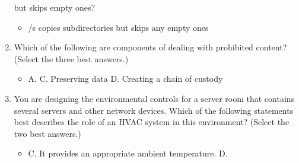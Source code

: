 \documentclass{article}
\begin{document}
\begin{enumerate}
but skips empty ones?
    \begin{itemize}
        \item /s copies subdirectories but skips any empty ones
    \end{itemize}
    \item Which of the following are components of dealing with prohibited
content? (Select the three best answers.)
    \begin{itemize}
        \item A. C. Preserving data D. Creating a chain of custody
    \end{itemize}
    \item You are designing the environmental controls for a server room
that contains several servers and other network devices. Which of
the following statements best describes the role of an HVAC
system in this environment? (Select the two best answers.)
    \begin{itemize}
        \item C. It provides an appropriate ambient temperature. D. 
    \end{itemize}
\end{enumerate}
\end{document}
